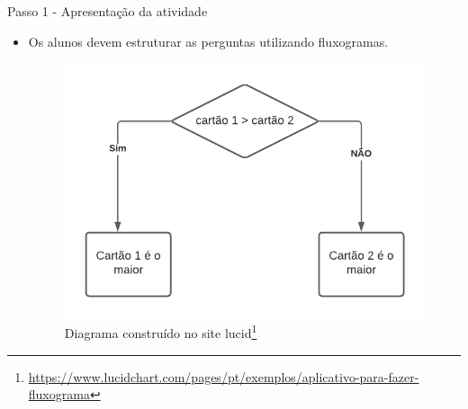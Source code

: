 \documentclass{beamer}
\begin{document}
\begin{frame}{Passo 1 - Apresentação da atividade}


\begin{itemize}
    \item Os alunos devem estruturar as perguntas utilizando fluxogramas.
    
\begin{figure}
\begin{center}
	\includegraphics[scale=0.5]{images/fluxograma1.png} 
\end{center}
\caption{Diagrama construído no site lucid\footnote{\url{https://www.lucidchart.com/pages/pt/exemplos/aplicativo-para-fazer-fluxograma}}}
\end{figure}

 
    

\end{itemize}


\end{frame}





\end{document}
